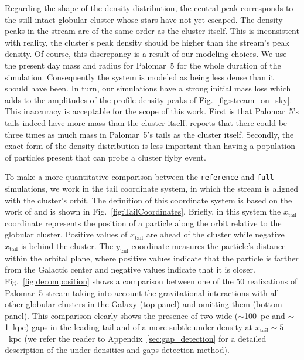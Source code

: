 \documentclass[draft]{aa}
\begin{document}
    Regarding the shape of the density distribution, the central peak corresponds to the still-intact globular cluster whose stars have not yet escaped. The density peaks in the stream are of the same order as the cluster itself. This is inconsistent with reality, the cluster's peak density should be higher than the stream's peak density. Of course, this discrepancy is a result of our modeling choices. We use the present day mass and radius for Palomar~5 for the whole duration of the simulation. Consequently the system is modeled as being less dense than it should have been. In turn, our simulations have a strong initial mass loss which adds to the amplitudes of the profile density peaks of Fig.~\ref{fig:stream_on_sky}. This inaccuracy is acceptable for the scope of this work. First is that Palomar~5's tails indeed have more mass than the cluster itself. \citet{2017ApJ...842..120I} reports that there could be three times as much mass in Palomar~5's tails as the cluster itself. Secondly, the exact form of the density distribution is less important than having a population of particles present that can probe a cluster flyby event.
    
    To make a more quantitative comparison between the \texttt{reference} and \texttt{full} simulations, we work in the tail coordinate system, in which the stream is aligned with the cluster's orbit. The definition of this coordinate system is based on the work of \citet{2004AJ....127.2753D} and is shown in Fig.~\ref{fig:TailCoordinates}. Briefly, in this system the $x_{\textrm{tail}}$ coordinate represents the position of a particle along the orbit relative to the globular cluster. Positive values of $x_{\textrm{tail}}$ are ahead of the cluster while negative $x_{\textrm{tail}}$ is behind the cluster. The $y_{\textrm{tail}}$ coordinate measures the particle's distance within the orbital plane, where positive values indicate that the particle is farther from the Galactic center and negative values indicate that it is closer. Fig.~\ref{fig:decomposition} shows a comparison between one of the 50 realizations of Palomar~5 stream taking into account the gravitational interactions with all other globular clusters in the Galaxy (top panel) and omitting them (bottom panel). This comparison clearly shows the presence of two wide ($\sim$100~pc and $\sim$1~kpc) gaps in the leading tail and of a more subtle under-density at $x_{\textrm{tail}}\sim 5$~kpc (we refer the reader to Appendix~\ref{sec:gap_detection} for a detailed description of the under-densities and gaps detection method). 
    
\end{document}
